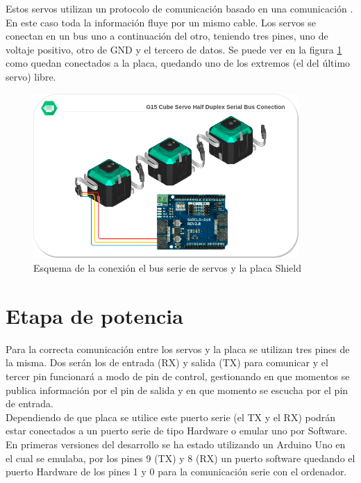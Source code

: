 	Estos servos utilizan un protocolo de comunicación basado en una comunicación . En este caso toda la información fluye por un mismo cable. Los servos se conectan en un bus uno a continuación del otro, teniendo tres pines, uno de voltaje positivo, otro de GND y el tercero de datos. Se puede ver en la figura \ref{fig:Electronica:bus-servos} como quedan conectados a la placa, quedando uno de los extremos (el del último servo) libre.
    \begin{figure}[H]
    	\centering
    	\includegraphics[width=0.9\textwidth]{figuras/Imagenes_Electronica/G15_bus_conection.png}   
    	\caption{Esquema de la conexión el bus serie de servos y la placa Shield}
    	\label{fig:Electronica:bus-servos}
    \end{figure}

\section{Etapa de potencia} \label{sec:Electronica:Potencia}

	Para la correcta comunicación entre los servos y la placa se utilizan tres pines de la misma. Dos serán los de entrada (RX) y salida (TX) para comunicar y el tercer pin funcionará a modo de pin de control, gestionando en que momentos se publica información por el pin de salida y en que momento se escucha por el pin de entrada.
	\\
	
	Dependiendo de que placa se utilice este puerto serie (el TX y el RX) podrán estar conectados a un puerto serie de tipo Hardware o emular uno por Software. 
	\\
	
	En primeras versiones del desarrollo se ha estado utilizando un Arduino Uno en el cual se emulaba, por los pines 9 (TX) y 8 (RX) un puerto software quedando el puerto Hardware de los pines 1 y 0 para la comunicación serie con el ordenador.
	\\
	
